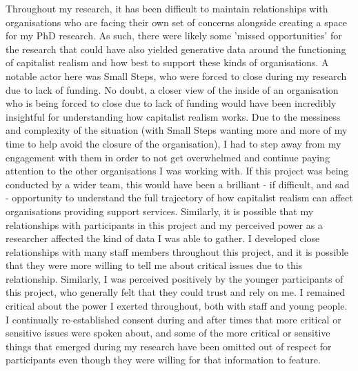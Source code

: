 
Throughout my research, it has been difficult to maintain relationships with organisations who are facing their own set of concerns alongside creating a space for my PhD research. As such, there were likely some 'missed opportunities' for the research that could have also yielded generative data around the functioning of capitalist realism and how best to support these kinds of organisations. A notable actor here was Small Steps, who were forced to close during my research due to lack of funding. No doubt, a closer view of the inside of an organisation who is being forced to close due to lack of funding would have been incredibly insightful for understanding how capitalist realism works. Due to the messiness and complexity of the situation (with Small Steps wanting more and more of my time to help avoid the closure of the organisation), I had to step away from my engagement with them in order to not get overwhelmed and continue paying attention to the other organisations I was working with. If this project was being conducted by a wider team, this would have been a brilliant - if difficult, and sad - opportunity to understand the full trajectory of how capitalist realism can affect organisations providing support services. Similarly, it is possible that my relationships with participants in this project and my perceived power as a researcher affected the kind of data I was able to gather. I developed close relationships with many staff members throughout this project, and it is possible that they were more willing to tell me about critical issues due to this relationship. Similarly, I was perceived positively by the younger participants of this project, who generally felt that they could trust and rely on me. I remained critical about the power I exerted throughout, both with staff and young people. I continually re-established consent during and after times that more critical or sensitive issues were spoken about, and some of the more critical or sensitive things that emerged during my research have been omitted out of respect for participants even though they were willing for that information to feature.

